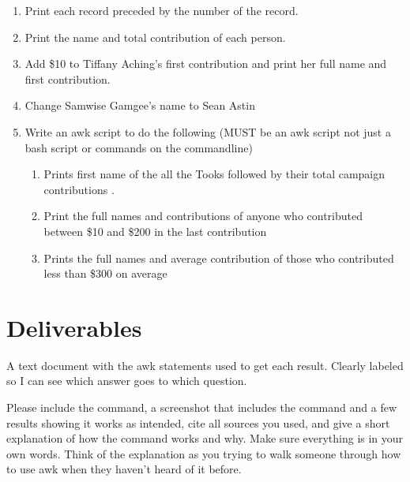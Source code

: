\documentclass[12pt]{article}
\begin{document}
\begin{enumerate}
        \item Print each record preceded by the number of the record.
        \item Print the name and total contribution of each person.
        \item Add \$10 to Tiffany Aching's first contribution and print her full name and first contribution.
        \item Change Samwise Gamgee's name to Sean Astin
        \item Write an awk script  to do the following (MUST be an awk script not just a bash script or commands on the commandline)
        \begin{enumerate}
            \item Prints first name of the all the Tooks followed by their total campaign contributions .
            \item Print the full names and contributions of anyone who contributed between \$10 and \$200 in the last contribution
            \item Prints the full names and average contribution of those who contributed less than \$300 on average

        \end{enumerate}
    
    
    

    \end{enumerate}



\section*{Deliverables}
A text document with the awk statements used to get each result.  Clearly labeled so I can see which answer goes to which question.


Please include the command, a screenshot that includes the command and a few results showing it works as intended, cite all sources you used, and give a short explanation of how the command works and why. Make sure everything is in your own words.  Think of the explanation as you trying to walk someone through how to use awk when they haven't heard of it before.
\end{document}
